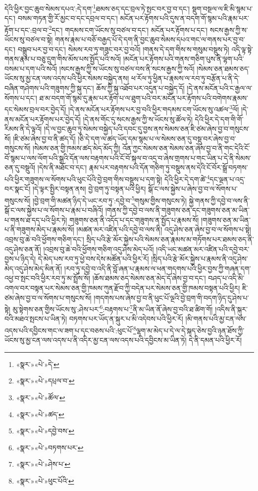 དེའི་ཕྱིར་བྱང་ཆུབ་སེམས་དཔའ་:དེ་དག་\footnote{«སྣར་»«པེ་»དེ་}ཐམས་ཅད་དང་བྲལ་ཏེ་སྤང་བར་བྱ་བ་དང་། སྡུག་བསྔལ་ལ་ཇི་མི་སྙམ་པ་དང་། བསམ་གཏན་གྱི་རོ་མྱང་བ་དང་དབྲལ་བ་དང་། མངོན་པར་རྟོགས་པའི་དུས་ན་བདག་གོ་སྙམ་པའི་རྣམ་པར་རྟོག་པ་དང་:བྲལ་བ་\footnote{«སྣར་»«པེ་»དཔྲལ་བ་}དང་། གདམས་ངག་ཡོངས་སུ་བཙལ་བ་དང་། མངོན་པར་རྟོགས་པ་དང་། སངས་རྒྱས་ཀྱི་ས་ཡོངས་སུ་བཙལ་བ་སྟེ། གནས་རྣམ་པ་བཅོ་བརྒྱད་པོ་དེ་དག་ནི་བྱང་ཆུབ་སེམས་དཔའ་གང་ལ་གནས་པར་བྱ་བ་དང་། བསྒྲུབ་པར་བྱ་བ་དང་། སེམས་རབ་ཏུ་གཟུང་བར་བྱ་བའོ། །གནས་དེ་དག་གིས་ས་གསུམ་བསྡུས་ཏེ། འདི་ལྟ་སྟེ་གནས་རྣམ་པ་བཅུ་དྲུག་གིས་མོས་པས་སྤྱོད་པའི་སའོ། །མངོན་པར་རྟོགས་པའི་གནས་གཅིག་པུས་ནི་ལྷག་པའི་བསམ་པ་དག་པའི་སའོ། །སངས་རྒྱས་ཀྱི་ས་ཡོངས་སུ་བཙལ་བས་ནི་སངས་རྒྱས་ཀྱི་སའོ། །སེམས་ཅན་ཐམས་ཅད་ཡོངས་སུ་མྱ་ངན་ལས་འདས་པའི་ཕྱིར་སེམས་བསྐྱེད་ནས། ཕ་རོལ་ཏུ་ཕྱིན་པ་རྣམས་ལ་རབ་ཏུ་བརྩོན་པ་ནི་དེ་བཞིན་གཤེགས་པའི་གཟུགས་ཀྱི་སྐུ་དང་། ཆོས་ཀྱི་སྐུ་འཐོབ་པར་འདུན་པ་བསྐྱེད་དོ། །དེ་ནས་མངོན་པའི་ང་རྒྱལ་ལ་སོགས་པ་དང་། ཐ་མ་བདག་གོ་སྙམ་དུ་རྣམ་པར་རྟོག་པ་ལ་ཐུག་པའི་བར་མངོན་པར་རྟོགས་པའི་བགེགས་རྣམས་དང་སེམས་བྲལ་བར་བྱེད་དོ། །དེ་ནས་མངོན་པར་རྟོགས་པར་བྱ་བའི་ཕྱིར་གདམས་ངག་ཡོངས་སུ་འཚལ་\footnote{«སྣར་»«པེ་»ཚོལ་}ལོ། །དེ་ནས་མངོན་པར་རྟོགས་པར་བྱེད་དོ། །དེ་ནས་གོང་དུ་སངས་རྒྱས་ཀྱི་ས་ཡོངས་སུ་ཚོལ་ཏེ། དེའི་ཕྱིར་དེ་དག་གི་གོ་རིམས་ནི་དེ་ལྟའོ། །དེ་ལ་བྱང་ཆུབ་ཏུ་སེམས་བསྐྱེད་པའི་དབང་དུ་བྱས་ནས་སེམས་ཅན་ཇི་ཙམ་ཞེས་བྱ་བ་གསུངས་སོ། །ཇི་ཙམ་ཞེས་བྱ་བ་ནི་ཚད་དོ། །ཅི་དེ་དག་ལ་ཚད་ཡོད་དམ་སྙམ་པ་ལ་སེམས་ཅན་དུ་བསྡུ་བར་ཞེས་བྱ་བ་གསུངས་སོ། །སེམས་ཅན་གྱི་ཁམས་ཚད་མེད་མོད་ཀྱི། འོན་ཀྱང་སེམས་ཅན་སེམས་ཅན་ཞེས་བྱ་བ་ནི་གང་དེའི་ངོ་བོ་སྙམ་པ་ལས་ལོག་པའི་སྒྲའི་དོན་ལས་བརྟགས་པའི་ངོ་བོ་སྐལ་བ་འདྲ་བ་ཞེས་གྲགས་པ་གང་ཡིན་པ་དེ་ནི་སེམས་ཅན་དུ་བསྡུའོ། །དེས་ནི་མཐོང་བ་དང་། རྣམ་པར་བརྟགས་པའི་དོན་གཅིག་ཏུ་བསྡུས་ནས་དེའི་ངོ་བོར་སྒྲོ་བཏགས་པའི་ཕྱིར་གཟུགས་ལ་སོགས་པའི་ཕུང་པོའི་བྱེ་བྲག་གིས་བསྡུས་པ་དག་སྟེ། དེའི་ཕྱིར་དེ་དག་ཚེ་\footnote{«སྣར་»«པེ་»ཚད་}དང་ལྡན་པ་འདྲ་བར་སྣང་ངོ། །དེ་ལྟར་སྤྱིར་བསྟན་ནས། བྱེ་བྲག་ཏུ་བསྟན་པའི་ཕྱིར། སྒོ་ང་ལས་སྐྱེས་པ་ཞེས་བྱ་བ་ལ་སོགས་པ་གསུངས་སོ། །བྱེ་བྲག་གི་མཚན་ཉིད་དེ་ཡང་རབ་ཏུ་:དབྱེ་བ་\footnote{«སྣར་»«པེ་»དབྱེ་བས་}གསུམ་གྱིས་གསུངས་ཏེ། སྐྱེ་གནས་ཀྱི་དབྱེ་བ་ལས་ནི་སྒོ་ང་ལས་སྐྱེས་པ་ལ་སོགས་པ་རྣམ་པ་བཞིའོ། །གནས་ཀྱི་དབྱེ་བ་ལས་ནི་གཟུགས་ཅན་དང་གཟུགས་ཅན་མ་ཡིན་པ་གནས་ཐ་དད་པའི་ཕྱིར་ཏེ། གཟུགས་ཅན་ནི་འདོད་པ་དང་གཟུགས་ན་སྤྱོད་པ་རྣམས་སོ། །གཟུགས་ཅན་མ་ཡིན་པ་ནི་གཟུགས་མེད་པ་རྣམས་སོ། །མཚན་མར་འཛིན་པའི་དབྱེ་བ་ལས་ནི། འདུ་ཤེས་ཅན་ཞེས་བྱ་བ་ལ་སོགས་པ་སྟེ། འབྲས་བུ་ཆེ་བའི་ཕྱོགས་གཅིག་དང་། སྲིད་པའི་རྩེ་མོར་སྐྱེས་པའི་སེམས་ཅན་རྣམས་མ་གཏོགས་པར་ཐམས་ཅད་ནི་འདུ་ཤེས་ཅན་ནོ། །འབྲས་བུ་ཆེ་བའི་ཕྱོགས་གཅིག་འདུ་ཤེས་མེད་པའོ། །འདི་ཡང་མཚན་མར་འཛིན་པའི་དབྱེ་བར་བྱས་པ་ཉིད་དེ། དེ་མེད་པས་རབ་ཏུ་ཕྱེ་བས་དེས་མཚོན་པའི་ཕྱིར་རོ། །སྲིད་པའི་རྩེ་མོར་སྐྱེས་པ་རྣམས་ནི་འདུ་ཤེས་མེད་འདུ་ཤེས་མེད་མིན་ནོ། །རབ་ཏུ་དབྱེ་བ་འདི་ནི་བློ་ཞན་པ་རྣམས་ལ་ཕན་གདགས་པའི་ཕྱིར་བྱས་ཀྱི་གཞན་དག་འཕྱ་བ་སྤང་བའི་ཕྱིར་རབ་ཏུ་མ་སྤྲོས་སོ། །ཆོས་ཐམས་ཅད་སེམས་ཅན་མེད་དོ་ཞེས་བྱ་བ་དང་། བཤད་པ་འདི་མི་འགལ་བར་བསྟན་པར་སེམས་ཅན་གྱི་ཁམས་ཀུན་རྫོབ་ཀྱི་བདེན་པར་སེམས་ཅན་གྱི་ཁམས་བསྟན་པའི་ཕྱིར། ཇི་ཙམ་ཞེས་བྱ་བ་ལ་སོགས་པ་གསུངས་སོ། །གདགས་པས་ཞེས་བྱ་བ་ནི་ཕུང་པོ་ལྔའི་བྱེ་བྲག་གི་བདག་ཉིད་དུ་ཤེས་པ་སྟེ། མུ་སྟེགས་ཅན་གྱིས་ཡོངས་སུ་:ཤེས་པར་\footnote{«སྣར་»«པེ་»བཏགས་པར་}:བརྟགས་པ་\footnote{«སྣར་»«པེ་»ཤེས་པ་}ནི་མ་ཡིན་ནོ་ཞེས་བྱ་བའི་ཐ་ཚིག་གོ། །འདིས་ནི་སྐུར་བའི་མཐའ་སྤངས་པ་ཡིན་ཏེ། བཏགས་པར་ཡོད་ན་སྐུར་པ་མི་འདེབས་པའི་ཕྱིར་རོ། །མི་གནས་པའི་མྱ་ངན་ལས་འདས་པའི་དབྱིངས་གང་ལ་ཟག་པ་དང་བཅས་པའི་:ཕུང་པོ་\footnote{«སྣར་»«པེ་»ཕུང་པོའི་}ལྷག་མ་མེད་པ་དེ་ལ་དེ་སྐད་ཅེས་བྱའི་ཉན་ཐོས་ཀྱི་ཡོངས་སུ་མྱ་ངན་ལས་འདས་པ་ནི་འདིར་མྱ་ངན་ལས་འདས་པའི་དབྱིངས་མ་ཡིན་ཏེ། དེ་ནི་དམན་པའི་ཕྱིར་རོ། 